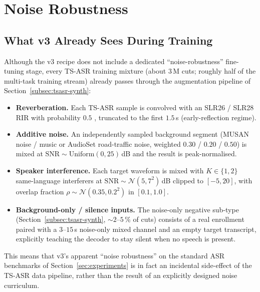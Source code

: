 \section{Noise Robustness}
\label{sec:noise}

\subsection{What v3 Already Sees During Training}

Although the v3 recipe does not include a dedicated ``noise-robustness''
fine-tuning stage, every TS-ASR training mixture (about $3$\,M cuts;
roughly half of the multi-task training stream) already passes through
the augmentation pipeline of Section~\ref{subsec:tsasr-synth}:

\begin{itemize}
  \item \textbf{Reverberation.} Each TS-ASR sample is convolved with
        an SLR26 / SLR28 RIR with probability $0.5$
        \cite{ko2017studyrir}, truncated to the first $1.5$\,s
        (early-reflection regime).
  \item \textbf{Additive noise.} An independently sampled background
        segment (MUSAN \cite{snyder2015musan} noise / music or AudioSet
        road-traffic noise, weighted $0.30$ / $0.20$ / $0.50$) is
        mixed at $\mathrm{SNR}\!\sim\!\mathrm{Uniform}(0, 25)$\,dB
        and the result is peak-normalised.
  \item \textbf{Speaker interference.} Each target waveform is mixed
        with $K\!\in\!\{1, 2\}$ same-language interferers at
        $\mathrm{SNR}\!\sim\!\mathcal{N}(5, 7^2)$\,dB clipped to
        $[-5, 20]$, with overlap fraction
        $\rho\!\sim\!\mathcal{N}(0.35, 0.2^2)$ in $[0.1, 1.0]$.
  \item \textbf{Background-only / silence inputs.} The noise-only
        negative sub-type (Section~\ref{subsec:tsasr-synth},
        $\sim$$2$--$5$\,\% of cuts) consists of a real enrollment
        paired with a $3$--$15$\,s noise-only mixed channel and an
        empty target transcript, explicitly teaching the decoder to
        stay silent when no speech is present.
\end{itemize}

This means that v3's apparent ``noise robustness'' on the standard
ASR benchmarks of Section~\ref{sec:experiments} is in fact an
incidental side-effect of the TS-ASR data pipeline, rather than the
result of an explicitly designed noise curriculum.

